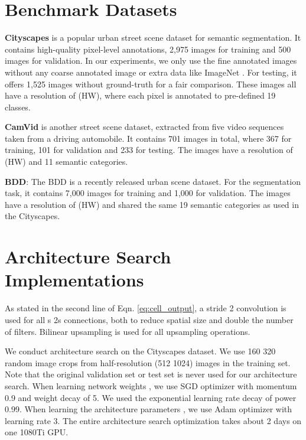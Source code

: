 \documentclass{article} \usepackage{iclr2020_conference,times}
\begin{document}
\section{Benchmark Datasets}\vspace{-0.7em} \label{app:datasets}
\textbf{Cityscapes} \citep{cordts2016cityscapes} is a popular urban street scene dataset for semantic segmentation. It contains high-quality pixel-level annotations, 2,975 images for training and 500 images for validation. In our experiments, we only use the fine annotated images without any coarse annotated image or extra data like ImageNet \citep{deng2009imagenet}. For testing, it offers 1,525 images without ground-truth for a fair comparison. These images all have a resolution of  (HW), where each pixel is annotated to pre-defined 19 classes.
    
\textbf{CamVid} \citep{brostow2008segmentation} is another street scene dataset, extracted from five video sequences taken from a driving automobile. It contains 701 images in total, where 367 for training, 101 for validation and 233 for testing. The images have a resolution of  (HW) and 11 semantic categories.

\textbf{BDD}: The BDD \citep{yu2018bdd100k} is a recently released urban scene dataset. For the segmentation task, it contains 7,000 images for training and 1,000 for validation. The images have a resolution of  (HW) and shared the same 19 semantic categories as used in the Cityscapes.


\section{Architecture Search Implementations}\vspace{-0.7em} \label{app:implementations}
As stated in the second line of Eqn. \ref{eq:cell_output}, a stride 2 convolution is used for all s  2s connections, both to reduce spatial size and double the number of filters. Bilinear upsampling is used for all upsampling operations.


We conduct architecture search on the Cityscapes dataset. We use 160  320 random image crops from half-resolution (512  1024) images in the training set. Note that the original validation set or test set is never used for our architecture search. When learning network weights , we use SGD optimizer with momentum 0.9 and weight decay of 5. We used the exponential learning rate decay of power 0.99. When learning the architecture parameters , we use Adam optimizer with learning rate 3. The entire architecture search optimization takes about 2 days on one 1080Ti GPU.
\end{document}
